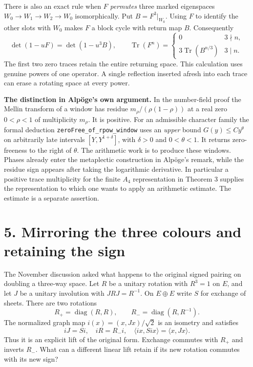 \documentclass[11pt,a4paper]{article}
\newcommand{\Tr}{\operatorname{Tr}}
\begin{document}
There is also an exact rule when $F$ \emph{permutes} three marked eigenspaces
$W_0\to W_1\to W_2\to W_0$ isomorphically. Put $B=F^3|_{W_0}$. Using $F$ to identify the other slots with
$W_0$ makes $F$ a block cycle with return map $B$. Consequently
\[
 \det(1-uF)=\det(1-u^3B),\qquad
 \Tr(F^n)=
 \begin{cases}0&3\nmid n,\\3\Tr(B^{n/3})&3\mid n.\end{cases}
\]
The first two zero traces retain the entire returning space. This calculation uses genuine powers of one
operator. A single reflection inserted afresh into each trace can erase a rotating space at every power.

\textbf{The distinction in Alpöge's own argument.} In the number-field proof the Mellin transform of a window
has residue $m_\rho/(\rho(1-\rho))$ at a real zero $0<\rho<1$ of multiplicity $m_\rho$.
It is positive. For an admissible character family the formal deduction
\texttt{zeroFree\_of\_rpow\_window} uses an \emph{upper} bound $G(y)\le C y^\theta$ on arbitrarily late
intervals $[Y,Y^{1+\delta}]$, with $\delta>0$ and $0<\theta<1$. It returns zero-freeness to the right of
$\theta$. The arithmetic work is to produce these windows. Phases already enter the metaplectic construction
in Alpöge's remark, while the residue sign appears after taking the logarithmic derivative.
In particular a positive trace multiplicity for the finite $A_4$ representation in Theorem 3 supplies the
representation to which one wants to apply an arithmetic estimate. The estimate is a separate assertion.

\newpage
\section*{5. Mirroring the three colours and retaining the sign}
The November discussion asked what happens to the original signed pairing on doubling a three-way space.
Let $R$ be a unitary rotation with $R^3=1$ on $E$, and let $J$ be a unitary involution with $JRJ=R^{-1}$.
On $E\oplus E$ write $S$ for exchange of sheets. There are two rotations
\[
 R_+=\operatorname{diag}(R,R),\qquad R_-=\operatorname{diag}(R,R^{-1}).
\]
The normalized graph map $i(x)=(x,Jx)/\sqrt2$ is an isometry and satisfies
\[
 iJ=Si,\quad iR=R_-i,\quad \langle ix,Six\rangle=\langle x,Jx\rangle.
\]
Thus it is an explicit lift of the original form. Exchange commutes with $R_+$ and inverts $R_-$.
What can a different linear lift retain if its new rotation commutes with its new sign?
\end{document}
